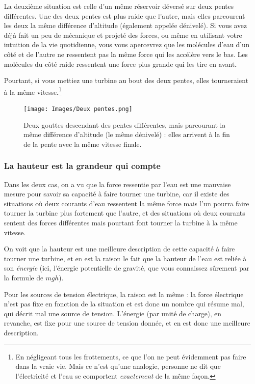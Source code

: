\documentclass{article}
\begin{document}
La deuxième situation est celle d'un même réservoir déversé sur deux pentes différentes. Une des deux pentes est plus raide que l'autre, mais elles parcourent les deux la même différence d'altitude (également appelée dénivelé). Si vous avez déjà fait un peu de mécanique et projeté des forces, ou même en utilisant votre intuition de la vie quotidienne, vous vous apercevrez que les molécules d'eau d'un côté et de l'autre ne ressentent pas la même force qui les accélère vers le bas. Les molécules du côté raide ressentent une force plus grande qui les tire en avant.

Pourtant, si vous mettiez une turbine au bout des deux pentes, elles tourneraient à la même vitesse.\footnote{En négligeant tous les frottements, ce que l'on ne peut évidemment pas faire dans la vraie vie. Mais ce n'est qu'une analogie, personne ne dit que l'électricité et l'eau se comportent \emph{exactement} de la même façon.}

\begin{figure}[h]
\centering
\texttt{[image: Images/Deux pentes.png]}
\caption{Deux gouttes descendant des pentes différentes, mais parcourant la même différence d'altitude (le même dénivelé) : elles arrivent à la fin de la pente avec la même vitesse finale.}
\end{figure}

\subsubsection{La hauteur est la grandeur qui compte}

Dans les deux cas, on a vu que la force ressentie par l'eau est une mauvaise mesure pour savoir sa capacité à faire tourner une turbine, car il existe des situations où deux courants d'eau ressentent la même force mais l'un pourra faire tourner la turbine plus fortement que l'autre, et des situations où deux courants sentent des forces différentes mais pourtant font tourner la turbine à la même vitesse.

On voit que la hauteur est une meilleure description de cette capacité à faire tourner une turbine, et en est la raison le fait que la hauteur de l'eau est reliée à son \emph{énergie} (ici, l'énergie potentielle de gravité, que vous connaissez sûrement par la formule de $mgh$).

Pour les sources de tension électrique, la raison est la même : la force électrique n'est pas fixe en fonction de la situation et est donc un nombre qui résume mal, qui décrit mal une source de tension. L'énergie (par unité de charge), en revanche, est fixe pour une source de tension donnée, et en est donc une meilleure description. 
\end{document}
